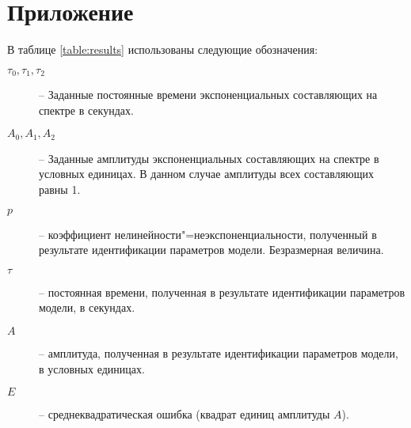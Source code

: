 \section*{Приложение}
	
    В таблице \ref{table:results} использованы следующие обозначения:
    \begin{description}
    	\item[$\tau_0, \tau_1, \tau_2$] -- Заданные постоянные времени
    	экспоненциальных составляющих на спектре в секундах.
    	\item[$A_0, A_1, A_2$] -- Заданные амплитуды экспоненциальных 
        составляющих на спектре в условных единицах. В данном случае 
        амплитуды всех составляющих равны 1.
    	\item[$p$] -- коэффициент нелинейности"=неэкспоненциальности,
    	полученный в результате идентификации параметров модели. 
        Безразмерная величина.
    	\item[$\tau$] -- постоянная времени, полученная в результате
    	идентификации параметров модели, в секундах.
    	\item[$A$] -- амплитуда, полученная в результате идентификации
    	параметров модели, в условных единицах.
    	\item[$E$] -- среднеквадратическая ошибка (квадрат единиц 
        амплитуды $A$).
    \end{description}